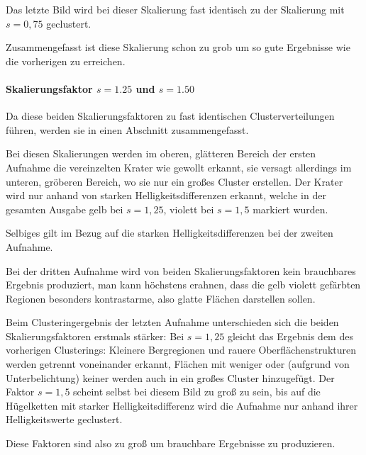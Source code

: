 Das letzte Bild wird bei dieser Skalierung fast identisch zu der Skalierung mit $s=0,75$ geclustert.

Zusammengefasst ist diese Skalierung schon zu grob um so gute Ergebnisse wie die vorherigen zu erreichen.

\paragraph{Skalierungsfaktor $s=1.25$ und $s=1.50$}

Da diese beiden Skalierungsfaktoren zu fast identischen Clusterverteilungen führen, werden sie in einen Abschnitt zusammengefasst.

Bei diesen Skalierungen werden im oberen, glätteren Bereich der ersten Aufnahme die vereinzelten Krater wie gewollt erkannt, sie versagt allerdings im unteren, gröberen Bereich, wo sie nur ein großes Cluster erstellen. Der Krater wird nur anhand von starken Helligkeitsdifferenzen erkannt, welche in der gesamten Ausgabe gelb bei $s=1,25$, \bzw violett bei $s=1,5$ markiert wurden. 

Selbiges gilt im Bezug auf die starken Helligkeitsdifferenzen bei der zweiten Aufnahme.

Bei der dritten Aufnahme wird von beiden Skalierungsfaktoren kein brauchbares Ergebnis produziert, man kann höchstens erahnen, dass die gelb \bzw violett gefärbten Regionen besonders kontrastarme, also glatte Flächen darstellen sollen.

Beim Clusteringergebnis der letzten Aufnahme unterschieden sich die beiden Skalierungsfaktoren erstmals stärker: Bei $s=1,25$ gleicht das Ergebnis dem des vorherigen Clusterings: Kleinere Bergregionen und rauere Oberflächenstrukturen werden getrennt voneinander erkannt, Flächen mit weniger oder (aufgrund von Unterbelichtung) keiner werden auch in ein großes Cluster hinzugefügt. Der Faktor $s=1,5$ scheint selbst bei diesem Bild zu groß zu sein, bis auf die Hügelketten mit starker Helligkeitsdifferenz wird die Aufnahme nur anhand ihrer Helligkeitswerte geclustert.

Diese Faktoren sind also zu groß um brauchbare Ergebnisse zu produzieren.


